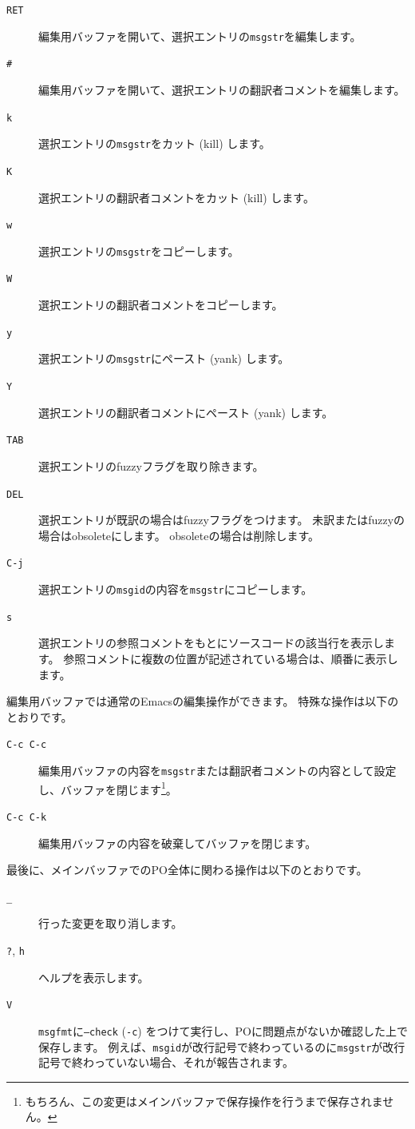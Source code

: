 \documentclass[mingoth,a4paper]{jsarticle}
\begin{document}
\begin{description}
 \item[\texttt{RET}] 編集用バッファを開いて、選択エントリの\texttt{msgstr}を編集します。
 \item[\texttt{\#}] 編集用バッファを開いて、選択エントリの翻訳者コメントを編集します。
 \item[\texttt{k}] 選択エントリの\texttt{msgstr}をカット (kill) します。
 \item[\texttt{K}] 選択エントリの翻訳者コメントをカット (kill) します。
 \item[\texttt{w}] 選択エントリの\texttt{msgstr}をコピーします。
 \item[\texttt{W}] 選択エントリの翻訳者コメントをコピーします。
 \item[\texttt{y}] 選択エントリの\texttt{msgstr}にペースト (yank) します。
 \item[\texttt{Y}] 選択エントリの翻訳者コメントにペースト (yank) します。
 \item[\texttt{TAB}] 選択エントリのfuzzyフラグを取り除きます。
 \item[\texttt{DEL}] 選択エントリが既訳の場合はfuzzyフラグをつけます。
	    未訳またはfuzzyの場合はobsoleteにします。
	    obsoleteの場合は削除します。
 \item[\texttt{C-j}] 選択エントリの\texttt{msgid}の内容を\texttt{msgstr}にコピーします。
 \item[\texttt{s}] 選択エントリの参照コメントをもとにソースコードの該当行を表示します。
	    参照コメントに複数の位置が記述されている場合は、順番に表示します。
\end{description}

編集用バッファでは通常のEmacsの編集操作ができます。
特殊な操作は以下のとおりです。

\begin{description}
 \item[\texttt{C-c C-c}] 編集用バッファの内容を\texttt{msgstr}または翻訳者コメントの内容として設定し、バッファを閉じます\footnote{もちろん、この変更はメインバッファで保存操作を行うまで保存されません。}。
 \item[\texttt{C-c C-k}] 編集用バッファの内容を破棄してバッファを閉じます。
\end{description}

最後に、メインバッファでのPO全体に関わる操作は以下のとおりです。

\begin{description}
 \item[\texttt{\_}] 行った変更を取り消します。
 \item[\texttt{?}, \texttt{h}] ヘルプを表示します。
 \item[\texttt{V}] \texttt{msgfmt}に\texttt{--check} (\texttt{-c}) をつけて実行し、POに問題点がないか確認した上で保存します。
	    例えば、\texttt{msgid}が改行記号で終わっているのに\texttt{msgstr}が改行記号で終わっていない場合、それが報告されます。
\end{description}
\end{document}
